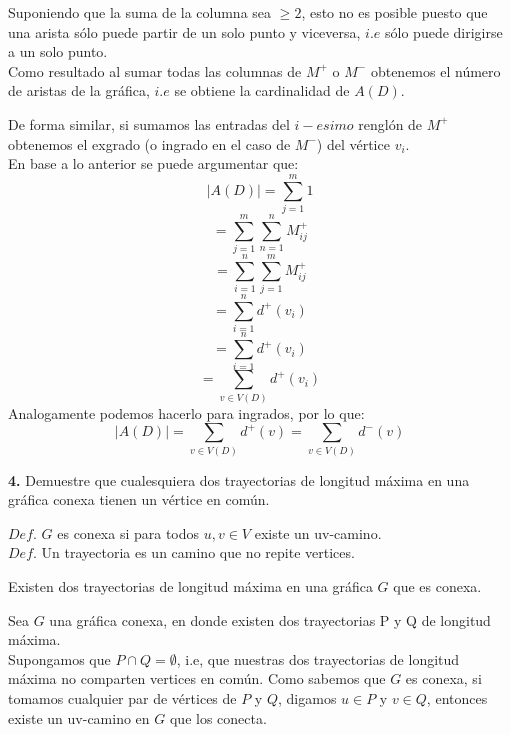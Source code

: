 \documentclass[12pt]{article}
\begin{document}
Suponiendo que la suma de la columna sea $\geq 2$, esto no es posible puesto que una arista sólo puede partir de un solo punto y viceversa, $i.e$ sólo 
puede dirigirse a un solo punto.\\

Como resultado al sumar todas las columnas de $M^+$ o $M^-$ obtenemos el número de aristas de la gráfica, $i.e$ se obtiene la 
cardinalidad de $A(D)$.

De forma similar, si sumamos las entradas del $i-esimo$ renglón de $M^+$ obtenemos el exgrado (o ingrado en el caso de $M^-$) del vértice $v_i$.\\

En base a lo anterior se puede argumentar que:
\[\mid A(D) \mid = \sum\limits_{j = 1}^{m} 1\]
\[= \sum\limits_{j = 1}^{m} \sum\limits_{n = 1}^{n} M^+_{ij}\]
\[= \sum\limits_{i = 1}^{n} \sum\limits_{j = 1}^{m} M^+_{ij}\]
\[= \sum\limits_{i = 1}^{n} d^+(v_i)\]
\[= \sum\limits_{i = 1}^{n} d^+(v_i)\]
\[= \sum_{\displaystyle v \in V(D)} d^+(v_i)\] 
Analogamente podemos hacerlo para ingrados, por lo que:
\[\mid A(D) \mid = \sum_{\displaystyle v \in V(D)} d^+(v) = \sum_{\displaystyle v \in V(D)} d^-(v)\]



\vspace{1cm}
%
%
\textbf{4.} Demuestre que cualesquiera dos trayectorias de longitud máxima en una gráfica
conexa tienen un vértice en común.\\

\begin{tcolorbox}[title=\textbf{Definiciones}, colback=blue!15!white, colframe=black!, breakable]
    $Def$. $G$ es conexa si para todos $u, v \in V$ existe un uv-camino.\\

    $Def$. Un trayectoria es un camino que no repite vertices.
\end{tcolorbox}

\begin{tcolorbox}[title=\textbf{Hipotesis}, colback=red!15!white, colframe=black!, breakable]
     Existen dos trayectorias de longitud máxima en una gráfica $G$ que es conexa. 
\end{tcolorbox}

Sea $G$ una gráfica conexa, en donde existen dos trayectorias P y Q de longitud máxima.\\

Supongamos que $P \cap Q = \emptyset$, i.e, que nuestras dos trayectorias de longitud máxima no 
comparten vertices en común. Como sabemos que $G$ es conexa, si tomamos cualquier par de vértices de $P$ y $Q$, 
digamos $u \in P$ y $v \in Q$, entonces existe un uv-camino en $G$ que los conecta.\\
\end{document}
